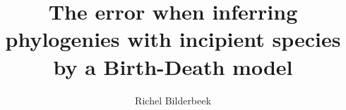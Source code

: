 \documentclass{article}
\title{The error when inferring phylogenies with incipient species by a Birth-Death model}
\author{Richel Bilderbeek}
\begin{document}
\maketitle

\begin{abstract}
  
\end{abstract}














\listoftodos
\end{document}
